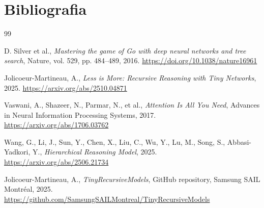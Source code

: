 \section{Bibliografia}
\begin{thebibliography}{99}

    D. Silver et al.,
    \textit{Mastering the game of Go with deep neural networks and tree search},
    Nature, vol. 529, pp. 484--489, 2016.
    \url{https://doi.org/10.1038/nature16961}

    Jolicoeur-Martineau, A.,
    \textit{Less is More: Recursive Reasoning with Tiny Networks},
    2025.
    \url{https://arxiv.org/abs/2510.04871}

    Vaswani, A., Shazeer, N., Parmar, N., et al.,
    \textit{Attention Is All You Need},
    Advances in Neural Information Processing Systems, 2017.
    \url{https://arxiv.org/abs/1706.03762}

    Wang, G., Li, J., Sun, Y., Chen, X., Liu, C., Wu, Y.,
    Lu, M., Song, S., Abbasi-Yadkori, Y.,
    \textit{Hierarchical Reasoning Model},
    2025.
    \url{https://arxiv.org/abs/2506.21734}

    Jolicoeur-Martineau, A.,
    \textit{TinyRecursiveModels},
    GitHub repository, Samsung SAIL Montréal, 2025.
    \url{https://github.com/SamsungSAILMontreal/TinyRecursiveModels}

\end{thebibliography}